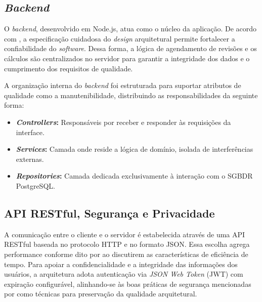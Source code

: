 \subsection{\textit{Backend}}

O \textit{backend}, desenvolvido em Node.js, atua como o núcleo da aplicação.
De acordo com , a especificação cuidadosa do \textit{design} arquitetural permite fortalecer a confiabilidade do \textit{software}.
Dessa forma, a lógica de agendamento de revisões e os cálculos são centralizados no servidor para garantir a integridade dos dados e o cumprimento dos requisitos de qualidade.

A organização interna do \textit{backend} foi estruturada para suportar atributos de qualidade como a manutenibilidade, distribuindo as responsabilidades da seguinte forma:

\begin{itemize}
    \item \textbf{\textit{Controllers}:} Responsáveis por receber e responder às requisições da interface.
    \item \textbf{\textit{Services}:} Camada onde reside a lógica de domínio, isolada de interferências externas.
    \item \textbf{\textit{Repositories}:} Camada dedicada exclusivamente à interação com o SGBDR PostgreSQL.
\end{itemize}

\subsection{API RESTful, Segurança e Privacidade}
\label{sec:seguranca_privacidade}

A comunicação entre o cliente e o servidor é estabelecida através de uma API RESTful baseada no protocolo HTTP e no formato JSON.
Essa escolha agrega performance conforme dito por  ao discutirem as características de eficiência de tempo.
Para apoiar a confidencialidade e a integridade das informações dos usuários, a arquitetura adota autenticação via \textit{JSON Web Token} (JWT) com expiração configurável, alinhando-se às boas práticas de segurança mencionadas por  como técnicas para preservação da qualidade arquitetural.

